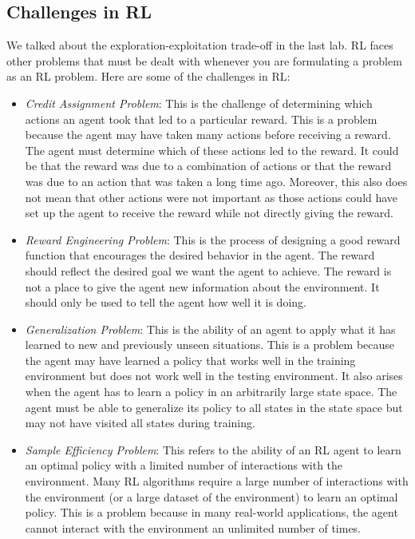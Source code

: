\subsection*{Challenges in RL}
We talked about the exploration-exploitation trade-off in the last lab.
RL faces other problems that must be dealt with whenever you are formulating a problem as an RL problem.
Here are some of the challenges in RL:
\begin{itemize}
    \item \emph{Credit Assignment Problem}: This is the challenge of determining which actions an agent took that led to a particular reward.
    This is a problem because the agent may have taken many actions before receiving a reward.
    The agent must determine which of these actions led to the reward.
    It could be that the reward was due to a combination of actions or that the reward was due to an action that was taken a long time ago.
    Moreover, this also does not mean that other actions were not important as those actions could have set up the agent to receive the reward while not directly giving the reward.

    \item \emph{Reward Engineering Problem}: This is the process of designing a good reward function that encourages the desired behavior in the agent.
    The reward should reflect the desired goal we want the agent to achieve.
    The reward is not a place to give the agent new information about the environment.
    It should only be used to tell the agent how well it is doing.

    \item \emph{Generalization Problem}: This is the ability of an agent to apply what it has learned to new and previously unseen situations.
    This is a problem because the agent may have learned a policy that works well in the training environment but does not work well in the testing environment.
    It also arises when the agent has to learn a policy in an arbitrarily large state space.
    The agent must be able to generalize its policy to all states in the state space but may not have visited all states during training.

    \item \emph{Sample Efficiency Problem}: This refers to the ability of an RL agent to learn an optimal policy with a limited number of interactions with the environment.
    Many RL algorithms require a large number of interactions with the environment (or a large dataset of the environment) to learn an optimal policy.
    This is a problem because in many real-world applications, the agent cannot interact with the environment an unlimited number of times.
\end{itemize}

